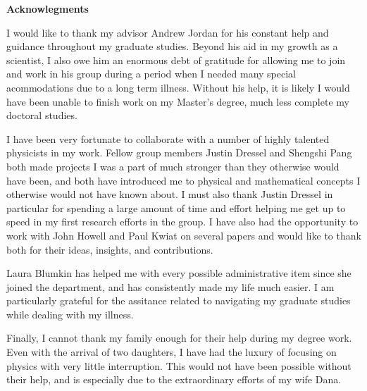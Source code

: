 \clearpage
\thispagestyle{empty}
\begin{center}
  \textbf{Acknowlegments}
\end{center}

I would like to thank my advisor Andrew Jordan for his constant help and guidance throughout my graduate studies.  Beyond his aid in my growth as a scientist, I also owe him an enormous debt of gratitude for allowing me to join and work in his group during a period when I needed many special acommodations due to a long term illness.  Without his help, it is likely I would have been unable to finish work on my Master's degree, much less complete my doctoral studies.

I have been very fortunate to collaborate with a number of highly talented physicists in my work.  Fellow group members Justin Dressel and Shengshi Pang both made projects I was a part of much stronger than they otherwise would have been, and both have introduced me to physical and mathematical concepts I otherwise would not have known about.  I must also thank Justin Dressel in particular for spending a large amount of time and effort helping me get up to speed in my first research efforts in the group.  I have also had the opportunity to work with John Howell and Paul Kwiat on several papers and would like to thank both for their ideas, insights, and contributions.

Laura Blumkin has helped me with every possible administrative item since she joined the department, and has consistently made my life much easier.  I am particularly grateful for the assitance related to navigating my graduate studies while dealing with my illness.

Finally, I cannot thank my family enough for their help during my degree work. Even with the arrival of two daughters, I have had the luxury of focusing on physics with very little interruption.  This would not have been possible without their help, and is especially due to the extraordinary efforts of my wife Dana. 

